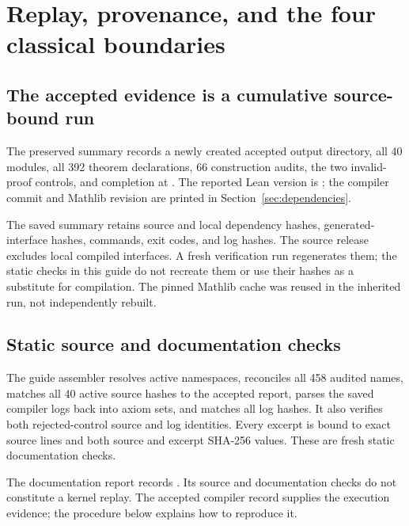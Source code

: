 \section{Replay, provenance, and the four classical boundaries}
\subsection{The accepted evidence is a cumulative source-bound run}
The preserved summary  records a newly created accepted output directory, all 40 modules, all 392 theorem declarations, 66 construction audits, the two invalid-proof controls, and completion at . The reported Lean version is ; the compiler commit and Mathlib revision are printed in Section~\ref{sec:dependencies}.

The saved summary retains source and local dependency hashes, generated-interface hashes, commands, exit codes, and log hashes. The source release excludes local compiled interfaces. A fresh verification run regenerates them; the static checks in this guide do not recreate them or use their hashes as a substitute for compilation. The pinned Mathlib cache was reused in the inherited run, not independently rebuilt.

\subsection{Static source and documentation checks}
The guide assembler resolves active namespaces, reconciles all 458 audited names, matches all 40 active source hashes to the accepted report, parses the saved compiler logs back into axiom sets, and matches all log hashes. It also verifies both rejected-control source and log identities. Every excerpt is bound to exact source lines and both source and excerpt SHA-256 values. These are fresh static documentation checks.

The documentation report records . Its source and documentation checks do not constitute a kernel replay. The accepted compiler record supplies the execution evidence; the procedure below explains how to reproduce it.

